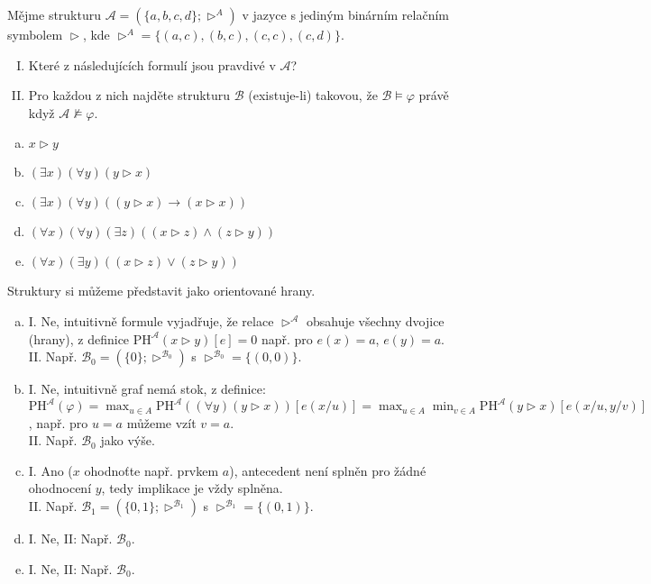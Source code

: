 \begin{problem}

    Mějme strukturu $\mathcal{A}=(\{a,b,c,d\};\vartriangleright^{A})$ v jazyce s jediným binárním relačním symbolem $\vartriangleright$, kde $\vartriangleright^{A}=\{(a,c), (b,c), (c,c), (c,d)\}$. 
    \begin{enumerate}[I.]
        \item Které z následujících formulí jsou pravdivé v $\mathcal A$? 
        \item Pro každou z nich najděte strukturu $\mathcal{B}$ (existuje-li) takovou, že $\mathcal{B}\models \varphi$ právě když $\mathcal{A}\not\models \varphi$.
    \end{enumerate}    
    \begin{enumerate}[(a)]
       \item $x \vartriangleright y$
       \item $(\exists x)(\forall y)(y \vartriangleright x)$
       \item $(\exists x)(\forall y)((y \vartriangleright x) \to (x \vartriangleright x))$
       \item $(\forall x)(\forall y)(\exists z)((x \vartriangleright z)\wedge(z \vartriangleright y))$
       \item $(\forall x)(\exists y)((x \vartriangleright z)\vee(z \vartriangleright y))$
    \end{enumerate}

    \begin{solution}

        Struktury si můžeme představit jako orientované hrany.
        \begin{enumerate}[(a)]
            \item I. Ne, intuitivně formule vyjadřuje, že relace  $\vartriangleright^\mathcal A$ obsahuje všechny dvojice (hrany), z definice $\mathrm{PH}^\mathcal A(x \vartriangleright y)[e]=0$ např. pro $e(x)=a$, $e(y)=a$.\\            
            II. Např. $\mathcal B_0=(\{0\};\vartriangleright^{\mathcal B_0})$ s $\vartriangleright^{\mathcal B_0}=\{(0,0)\}$.
            \item I. Ne, intuitivně graf nemá stok, z definice: $\mathrm{PH}^\mathcal A(\varphi)=\max_{u\in A}\mathrm{PH}^\mathcal A((\forall y)(y \vartriangleright x))[e(x/u)]=\max_{u\in A}\min_{v\in A}\mathrm{PH}^\mathcal A(y \vartriangleright x)[e(x/u,y/v)]$, např. pro $u=a$ můžeme vzít $v=a$.\\
            II. Např. $\mathcal B_0$ jako výše.
            \item I. Ano ($x$ ohodnoťte např. prvkem $a$), antecedent není splněn pro žádné ohodnocení $y$, tedy implikace je vždy splněna.\\
            II. Např. $\mathcal B_1=(\{0,1\};\vartriangleright^{\mathcal B_1})$ s $\vartriangleright^{\mathcal B_1}=\{(0,1)\}$.
            \item I. Ne, II: Např. $\mathcal B_0$.
            \item I. Ne, II: Např. $\mathcal B_0$.  
        \end{enumerate}
        

\end{solution}
\end{problem}

